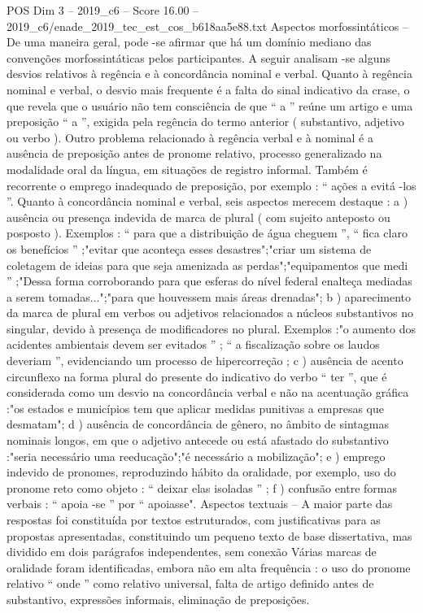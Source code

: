 \begin{textsample}{POS Dim 3 – 2019\_c6 – Score 16.00 – 2019\_c6/enade\_2019\_tec\_est\_cos\_b618aa5e88.txt}
Aspectos morfossintáticos – De uma maneira geral, pode -se afirmar que há um domínio mediano das convenções morfossintáticas pelos participantes.
A seguir analisam -se alguns desvios relativos à regência e à concordância nominal e verbal.
Quanto à regência nominal e verbal, o desvio mais frequente é a falta do sinal indicativo da crase, o que revela que o usuário não tem consciência de que “ a ” reúne um artigo e uma preposição “ a ”, exigida pela regência do termo anterior ( substantivo, adjetivo ou verbo ).
Outro problema relacionado à regência verbal e à nominal é a ausência de preposição antes de pronome relativo, processo generalizado na modalidade oral da língua, em situações de registro informal.
Também é recorrente o emprego inadequado de preposição, por exemplo : “ ações a evitá -los ”.
Quanto à concordância nominal e verbal, seis aspectos merecem destaque : a ) ausência ou presença indevida de marca de plural ( com sujeito anteposto ou posposto ).
Exemplos : “ para que a distribuição de água cheguem ”, “ fica claro os benefícios ” ;"evitar que aconteça esses desastres";"criar um sistema de coletagem de ideias para que seja amenizada as perdas";"equipamentos que medi ” ;"Dessa forma corroborando para que esferas do nível federal enalteça mediadas a serem tomadas...";"para que houvessem mais áreas drenadas"; b ) aparecimento da marca de plural em verbos ou adjetivos relacionados a núcleos substantivos no singular, devido à presença de modificadores no plural.
Exemplos :"o aumento dos acidentes ambientais devem ser evitados ” ; “ a fiscalização sobre os laudos deveriam ”, evidenciando um processo de hipercorreção ; c ) ausência de acento circunflexo na forma plural do presente do indicativo do verbo “ ter ”, que é considerada como um desvio na concordância verbal e não na acentuação gráfica :"os estados e municípios tem que aplicar medidas punitivas a empresas que desmatam"; d ) ausência de concordância de gênero, no âmbito de sintagmas nominais longos, em que o adjetivo antecede ou está afastado do substantivo :"seria necessário uma reeducação";"é necessário a mobilização"; e ) emprego indevido de pronomes, reproduzindo hábito da oralidade, por exemplo, uso do pronome reto como objeto : “ deixar elas isoladas ” ; f ) confusão entre formas verbais : “ apoia -se ” por “ apoiasse".
Aspectos textuais – A maior parte das respostas foi constituída por textos estruturados, com justificativas para as propostas apresentadas, constituindo um pequeno texto de base dissertativa, mas dividido em dois parágrafos independentes, sem conexão Várias marcas de oralidade foram identificadas, embora não em alta frequência : o uso do pronome relativo “ onde ” como relativo universal, falta de artigo definido antes de substantivo, expressões informais, eliminação de preposições.

\end{textsample}
